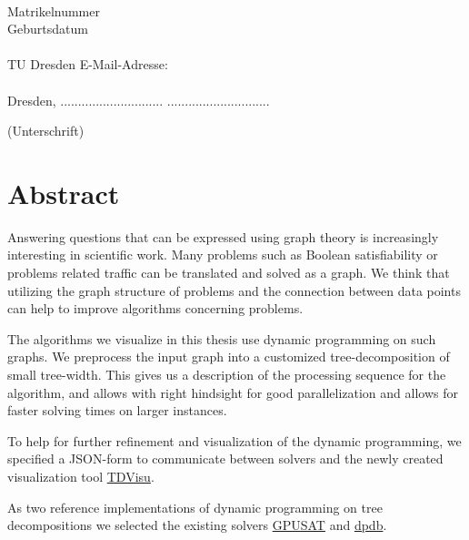 \documentclass[a4paper, 12pt]{scrartcl}
\begin{document}
\noindent
\myauthor \\
Matrikelnummer \mymatriculation\\
Geburtsdatum \mybirthday\\\\
TU Dresden E-Mail-Adresse:\\
 \myemail\\[40pt]


Dresden,  ............................. \hfill .............................
\begin{flushright}
	(Unterschrift)\hspace{1em}
\end{flushright}


\newpage

\section*{Abstract}
\vspace{4ex}

Answering questions that can be expressed using graph theory is increasingly interesting in scientific work.
Many problems such as Boolean satisfiability or problems related traffic can be translated and solved as a graph.
We think that utilizing the graph structure of problems and the connection between data points can help to improve algorithms concerning problems.

The algorithms we visualize in this thesis use dynamic programming on such graphs.
We preprocess the input graph into a customized tree-decomposition of small tree-width.
This gives us a description of the processing sequence for the algorithm, and allows 
with right hindsight for good parallelization and allows for faster solving times on larger instances.

To help for further refinement and visualization of the dynamic programming,
we specified a JSON-form to communicate between solvers and the newly created visualization tool \href{https://github.com/VaeterchenFrost/tdvisu}{TDVisu}.

As two reference implementations of dynamic programming on tree decompositions we selected the existing solvers \href{https://github.com/daajoe/GPUSAT}{GPUSAT} and \href{https://github.com/hmarkus/dp_on_dbs}{dpdb}.
\end{document}
